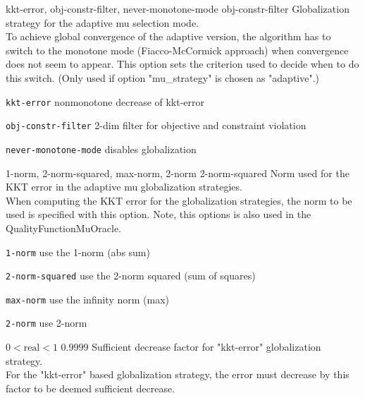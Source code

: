 %
{kkt-error, obj-constr-filter, never-monotone-mode}%
{obj-constr-filter}%
{Globalization strategy for the adaptive mu selection mode.\\
To achieve global convergence of the adaptive version, the algorithm has to switch to the monotone mode (Fiacco-McCormick approach) when convergence does not seem to appear.  This option sets the criterion used to decide when to do this switch. (Only used if option "mu\_strategy" is chosen as "adaptive".)}%
{\begin{list}{}{
\setlength{\parsep}{0em}
\setlength{\leftmargin}{5ex}
\setlength{\labelwidth}{2ex}
\setlength{\itemindent}{0ex}
\setlength{\topsep}{0pt}}
\item[\texttt{kkt-error}] nonmonotone decrease of kkt-error
\item[\texttt{obj-constr-filter}] 2-dim filter for objective and constraint violation
\item[\texttt{never-monotone-mode}] disables globalization
\end{list}
}

%
{1-norm, 2-norm-squared, max-norm, 2-norm}%
{2-norm-squared}%
{Norm used for the KKT error in the adaptive mu globalization strategies.\\
When computing the KKT error for the globalization strategies, the norm to be used is specified with this option. Note, this options is also used in the QualityFunctionMuOracle.}%
{\begin{list}{}{
\setlength{\parsep}{0em}
\setlength{\leftmargin}{5ex}
\setlength{\labelwidth}{2ex}
\setlength{\itemindent}{0ex}
\setlength{\topsep}{0pt}}
\item[\texttt{1-norm}] use the 1-norm (abs sum)
\item[\texttt{2-norm-squared}] use the 2-norm squared (sum of squares)
\item[\texttt{max-norm}] use the infinity norm (max)
\item[\texttt{2-norm}] use 2-norm
\end{list}
}

%
{$0<\textrm{real}<1$}%
{$0.9999$}%
{Sufficient decrease factor for "kkt-error" globalization strategy.\\
For the "kkt-error" based globalization strategy, the error must decrease by this factor to be deemed sufficient decrease.}%
{}

